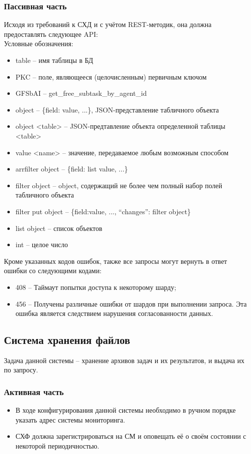 \documentclass[a4paper,12pt]{report}
\numberwithin{equation}{section}
\begin{document}
  \subsubsection{Пассивная часть}
  Исходя из требований к СХД и с учётом REST-методик, она должна предоставлять следующее API:
  \\
  Условные обозначения:
  \begin{itemize}
    \item table -- имя таблицы в БД
    \item PKC -- поле, являющееся (целочисленным) первичным ключом
    \item GFSbAI -- get\_free\_subtask\_by\_agent\_id
    \item object -- \{field: value, ...\}, JSON-представление табличного объекта
    \item object <table> -- JSON-предтавление объекта определенной таблицы <table>
    \item value <name> -- значение, передаваемое любым возможным способом
    \item arrfilter object -- \{field: list value, ...\}
    \item filter object -- object, содержащий не более чем полный набор полей табличного объекта
    \item filter put object -- \{field:value, ..., ``changes'': filter object\}
    \item list object -- список объектов
    \item int -- целое число
  \end{itemize}
  
  
  Кроме указанных кодов ошибок, также все запросы могут вернуть в ответ ошибки со следующими кодами:
  \begin{itemize}
    \item 408 -- Таймаут попытки доступа к некоторому шарду;
    \item 456 -- Получены различные ошибки от шардов при выполнении запроса. Эта ошибка является следствием нарушения согласованности данных.
  \end{itemize}
  
  \subsection{Система хранения файлов}
  Задача данной системы -- хранение архивов задач и их результатов, и выдача их по запросу.
  
  \subsubsection{Активная часть}
  \begin{itemize}
    \item В ходе конфигурирования данной системы необходимо в ручном порядке указать адрес системы мониторинга.
    \item СХФ должна зарегистрироваться на СМ и оповещать её о своём состоянии с некоторой периодичностью.
  \end{itemize}
  
\end{document}
